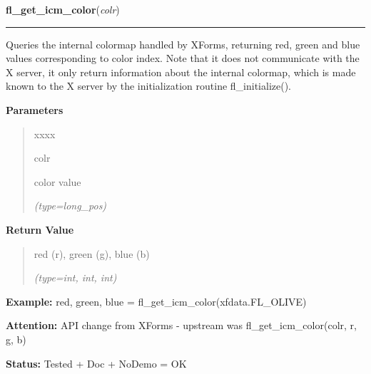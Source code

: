     \vspace{0.5ex}

\hspace{.8\funcindent}\begin{boxedminipage}{\funcwidth}

    \raggedright \textbf{fl\_get\_icm\_color}(\textit{colr})

    \vspace{-1.5ex}

    \rule{\textwidth}{0.5\fboxrule}
\setlength{\parskip}{2ex}
    Queries the internal colormap handled by XForms, returning red, green 
    and blue values corresponding to color index. Note that it does not 
    communicate with the X server, it only return information about the 
    internal colormap, which is made known to the X server by the 
    initialization routine fl\_initialize().

\setlength{\parskip}{1ex}
      \textbf{Parameters}
      \vspace{-1ex}

      \begin{quote}
        \begin{Ventry}{xxxx}

          \item[colr]

          color value

            {\it (type=long\_pos)}

        \end{Ventry}

      \end{quote}

      \textbf{Return Value}
    \vspace{-1ex}

      \begin{quote}
      red (r), green (g), blue (b)

      {\it (type=int, int, int)}

      \end{quote}

\textbf{Example:} red, green, blue = fl\_get\_icm\_color(xfdata.FL\_OLIVE)



\textbf{Attention:} API change from XForms - upstream was fl\_get\_icm\_color(colr, r, g, b)



\textbf{Status:} Tested + Doc + NoDemo = OK



    \end{boxedminipage}

